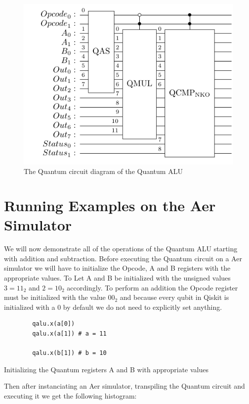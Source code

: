 \begin{figure}[ht]
    \centering
    \includegraphics{images/6_Complete_System/qalu_complete.pdf}
    \caption{The Quantum circuit diagram of the Quantum ALU}
\end{figure}

\section{Running Examples on the Aer Simulator}

We will now demonstrate all of the operations of the Quantum ALU starting with addition and subtraction. Before executing the
Quantum circuit on a Aer simulator we will have to initialize the Opcode, A and B registers with the appropriate values. To
Let A and B be initialized with the unsigned values $3=11_2$ and $2=10_2$ accordingly. To perform an addition the Opcode
register must be initialized with the value $00_2$ and because every qubit in Qiskit is initialized with a $0$ by default
we do not need to explicitly set anything.

\begin{listing}[ht]
    \begin{verbatim}
        qalu.x(a[0])
        qalu.x(a[1]) # a = 11

        qalu.x(b[1]) # b = 10
    \end{verbatim}
    \caption{Initializing the Quantum registers A and B with appropriate values}
    \label{ls:6_init_add}
\end{listing}

Then after instanciating an Aer simulator, transpiling the Quantum circuit and executing it we get the following histogram:

